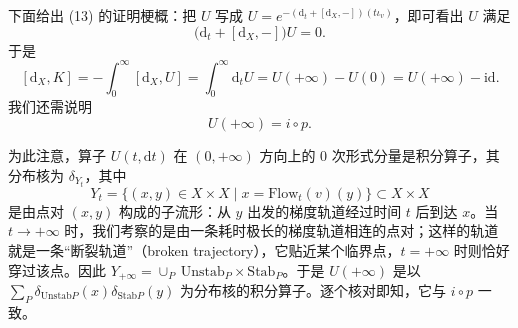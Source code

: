 
下面给出 (13) 的证明梗概：把 $U$ 写成 $U=e^{-(\mathrm{d}_t+[\mathrm{d}_X,-])(t\iota_v)}$，即可看出 $U$ 满足
\begin{equation}\tag{14}\label{eq:14}
  \bigl(\mathrm{d}_t+[\mathrm{d}_X,-]\bigr)U=0.
\end{equation}
于是
\[
  [\mathrm{d}_X,K]=-\int_0^\infty[\mathrm{d}_X,U]
  =\int_0^\infty \mathrm{d}_t U
  =U(+\infty)-U(0)=U(+\infty)-\mathrm{id}.
\]
我们还需说明
\begin{equation}\tag{15}\label{eq:15}
  U(+\infty)=i\circ p.
\end{equation}


为此注意，算子 $U(t,\mathrm{d}t)$ 在 $(0,+\infty)$ 方向上的 0 次形式分量是积分算子，其分布核为 $\delta_{Y_t}$，其中
\begin{equation}\tag{16}\label{eq:16}
  Y_t=\{(x,y)\in X\times X\mid x=\mathrm{Flow}_t(v)(y)\}\subset X\times X
\end{equation}
是由点对 $(x,y)$ 构成的子流形：从 $y$ 出发的梯度轨道经过时间 $t$ 后到达 $x$。当 $t\to+\infty$ 时，我们考察的是由一条耗时极长的梯度轨道相连的点对；这样的轨道就是一条“断裂轨道”（broken trajectory），它贴近某个临界点，$t=+\infty$ 时则恰好穿过该点。因此 $Y_{+\infty}=\cup_P\,\mathrm{Unstab}_P\times\mathrm{Stab}_P$。于是 $U(+\infty)$ 是以 $\sum_P\delta_{\mathrm{Unstab}P}(x)\delta_{\mathrm{Stab}P}(y)$ 为分布核的积分算子。逐个核对即知，它与 $i\circ p$ 一致。



